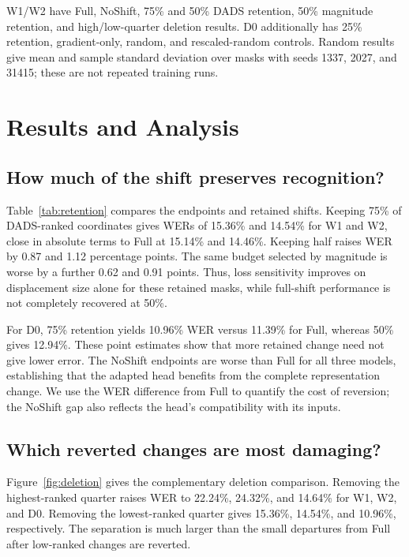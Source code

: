 \documentclass{article}
\begin{document}
W1/W2 have Full, NoShift, 75\% and 50\% DADS retention, 50\% magnitude retention, and high/low-quarter deletion results. D0 additionally has 25\% retention, gradient-only, random, and rescaled-random controls. Random results give mean and sample standard deviation over masks with seeds 1337, 2027, and 31415; these are not repeated training runs.

\section{Results and Analysis}
\label{sec:results}
\subsection{How much of the shift preserves recognition?}
Table~\ref{tab:retention} compares the endpoints and retained shifts. Keeping 75\% of DADS-ranked coordinates gives WERs of 15.36\% and 14.54\% for W1 and W2, close in absolute terms to Full at 15.14\% and 14.46\%. Keeping half raises WER by 0.87 and 1.12 percentage points. The same budget selected by magnitude is worse by a further 0.62 and 0.91 points. Thus, loss sensitivity improves on displacement size alone for these retained masks, while full-shift performance is not completely recovered at 50\%.

\begin{table}[t]
\centering
\caption{Test WER (\%) under the original frozen head. Retention percentages refer to shift coordinates; all inputs remain 1024-dimensional.}
\label{tab:retention}

\end{table}

For D0, 75\% retention yields 10.96\% WER versus 11.39\% for Full, whereas 50\% gives 12.94\%. These point estimates show that more retained change need not give lower error. The NoShift endpoints are worse than Full for all three models, establishing that the adapted head benefits from the complete representation change. We use the WER difference from Full to quantify the cost of reversion; the NoShift gap also reflects the head's compatibility with its inputs.

\subsection{Which reverted changes are most damaging?}
Figure~\ref{fig:deletion} gives the complementary deletion comparison. Removing the highest-ranked quarter raises WER to 22.24\%, 24.32\%, and 14.64\% for W1, W2, and D0. Removing the lowest-ranked quarter gives 15.36\%, 14.54\%, and 10.96\%, respectively. The separation is much larger than the small departures from Full after low-ranked changes are reverted.
\end{document}
